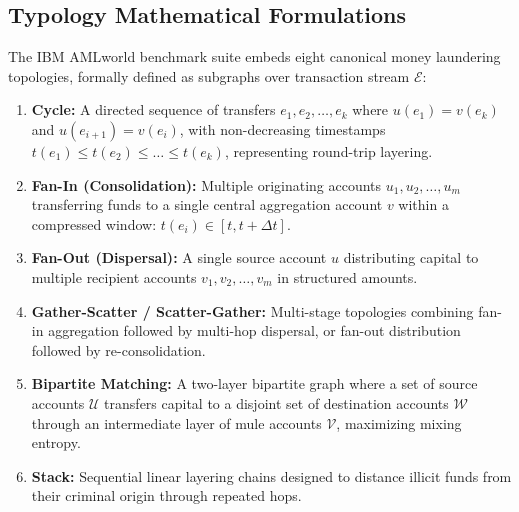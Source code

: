 \documentclass[pdflatex,sn-mathphys,Numbered]{sn-jnl}
\theoremstyle{thmstyleone}
\theoremstyle{thmstyletwo}
\theoremstyle{thmstylethree}
\begin{document}
\begin{appendices}
\section{Typology Mathematical Formulations}
\label{sec:appendix_typologies}

The IBM AMLworld benchmark suite embeds eight canonical money laundering topologies, formally defined as subgraphs over transaction stream $\mathcal{E}$:
\begin{enumerate}
    \item \textbf{Cycle:} A directed sequence of transfers $e_1, e_2, \dots, e_k$ where $u(e_1) = v(e_k)$ and $u(e_{i+1}) = v(e_i)$, with non-decreasing timestamps $t(e_1) \le t(e_2) \le \dots \le t(e_k)$, representing round-trip layering.
    \item \textbf{Fan-In (Consolidation):} Multiple originating accounts $u_1, u_2, \dots, u_m$ transferring funds to a single central aggregation account $v$ within a compressed window: $t(e_i) \in [t, t + \Delta t]$.
    \item \textbf{Fan-Out (Dispersal):} A single source account $u$ distributing capital to multiple recipient accounts $v_1, v_2, \dots, v_m$ in structured amounts.
    \item \textbf{Gather-Scatter / Scatter-Gather:} Multi-stage topologies combining fan-in aggregation followed by multi-hop dispersal, or fan-out distribution followed by re-consolidation.
    \item \textbf{Bipartite Matching:} A two-layer bipartite graph where a set of source accounts $\mathcal{U}$ transfers capital to a disjoint set of destination accounts $\mathcal{W}$ through an intermediate layer of mule accounts $\mathcal{V}$, maximizing mixing entropy.
    \item \textbf{Stack:} Sequential linear layering chains designed to distance illicit funds from their criminal origin through repeated hops.
\end{enumerate}

\end{appendices}


\end{document}
